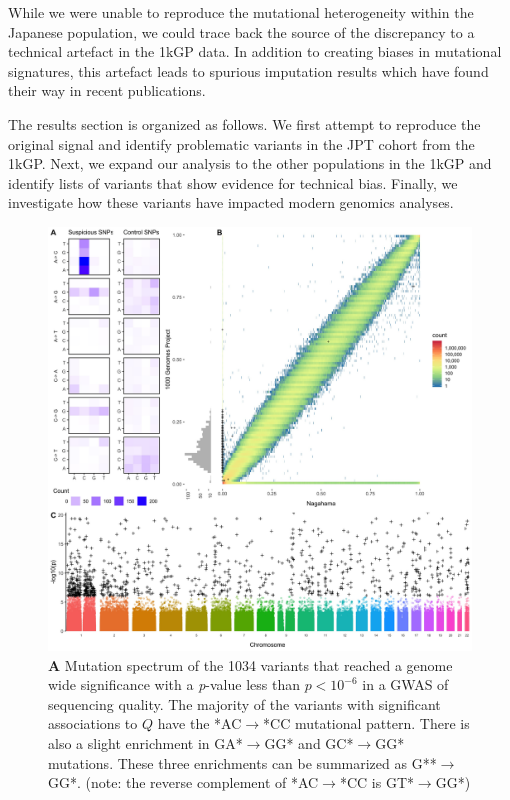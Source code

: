 \documentclass[9pt,lineno]{elife}
\begin{document}
While we were unable to reproduce the mutational heterogeneity within the Japanese population, we could trace back the source of the discrepancy to a technical artefact in the 1kGP data.
In addition to creating biases in mutational signatures, this artefact leads to spurious imputation results which have found their way in recent publications.


The results section is organized as follows.
We first attempt to reproduce the original signal and identify problematic variants in the JPT cohort from the 1kGP. 
Next, we expand our analysis to the other populations in the 1kGP and identify lists of variants that show evidence for technical bias.
Finally, we investigate how these variants have impacted modern genomics analyses.  
  

\begin{figure}
\includegraphics[width=\hsize,keepaspectratio]{./Figures/Figure1.jpg}
\caption{
\textbf{A} 
Mutation spectrum of the 1034 variants that reached a genome wide significance with a \textit{p}-value less than $p < 10^{-6}$  in a GWAS of sequencing quality. 
The majority of the variants with significant associations to $Q$ have the *AC${\rightarrow}$*CC mutational pattern. There is also a slight enrichment in GA*${\rightarrow}$GG* and GC*${\rightarrow}$GG* mutations. These three enrichments can be summarized as G**${\rightarrow}$GG*. (note: the reverse complement of *AC${\rightarrow}$*CC is GT*${\rightarrow}$GG*)
}
\end{figure}
\end{document}

